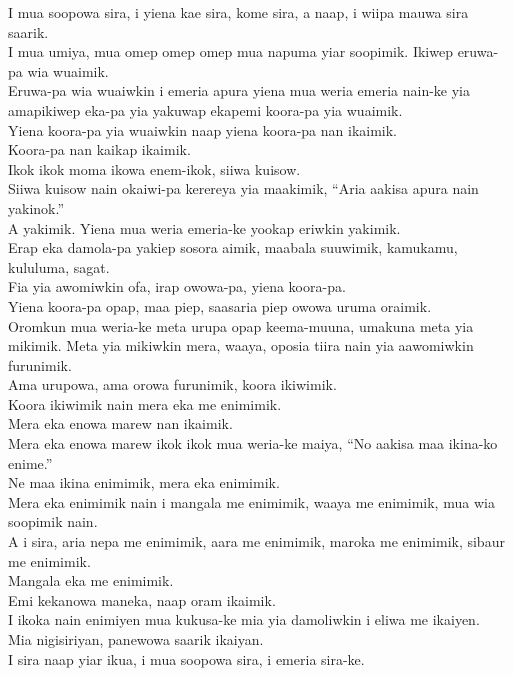 I mua soopowa sira, i yiena kae sira, kome sira, a naap, i wiipa mauwa sira saarik. \\
\textrm{I mua umiya, mua omep omep omep mua napuma yiar soopimik.}
Ikiwep eruwa-pa wia wuaimik. \\
Eruwa-pa wia wuaiwkin i emeria apura yiena mua weria emeria nain-ke yia amapikiwep eka-pa yia yakuwap ekapemi koora-pa yia wuaimik. \\
Yiena koora-pa yia wuaiwkin naap yiena koora-pa nan ikaimik. \\
Koora-pa nan kaikap ikaimik. \\
Ikok ikok moma ikowa enem-ikok, siiwa kuisow. \\
Siiwa kuisow nain okaiwi-pa kerereya yia maakimik, “Aria aakisa apura nain yakinok.” \\
A yakimik. Yiena mua weria emeria-ke yookap eriwkin yakimik. \\
Erap eka damola-pa yakiep sosora aimik, maabala suuwimik, kamukamu, kululuma, sagat. \\
Fia yia awomiwkin ofa, irap owowa-pa, yiena koora-pa. \\
Yiena koora-pa opap, maa piep, saasaria piep owowa uruma oraimik. \\
\textrm{Oromkun mua weria-ke meta urupa opap keema-muuna, umakuna meta yia mikimik.}
Meta yia mikiwkin mera, waaya, oposia tiira nain yia aawomiwkin furunimik. \\
Ama urupowa, ama orowa furunimik, koora ikiwimik. \\
Koora ikiwimik nain mera eka me enimimik. \\
Mera eka enowa marew nan ikaimik. \\
Mera eka enowa marew ikok ikok mua weria-ke maiya, “No aakisa maa ikina-ko enime.” \\
Ne maa ikina enimimik, mera eka enimimik. \\
Mera eka enimimik nain i mangala me enimimik, waaya me enimimik, mua wia soopimik nain. \\
A i sira, aria nepa me enimimik, aara me enimimik, maroka me enimimik, sibaur me enimimik. \\
Mangala eka me enimimik. \\
Emi kekanowa maneka, naap oram ikaimik. \\
I ikoka nain enimiyen mua kukusa-ke mia yia damoliwkin i eliwa me ikaiyen. \\
Mia nigisiriyan, panewowa saarik ikaiyan. \\
I sira naap yiar ikua, i mua soopowa sira, i emeria sira-ke. \\
